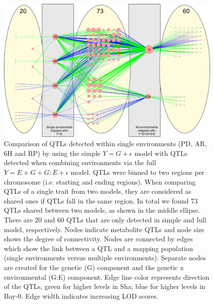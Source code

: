 \begin{figure}[h!]
  \centering
  \includegraphics[keepaspectratio,scale=0.30]{eps/image_3_2_2.eps}
  \caption[Comparison of QTLs detected]{Comparison of QTLs detected within single environments (PD, AR, 
          6H and RP) by using the simple $Y=G+\epsilon$ model with QTLs detected when combining environments via the full 
          $Y=E+G+G:E+\epsilon$ model. QTLs were binned to two regions per chromosome (i.e. starting and ending regions).  
          When comparing QTLs of a single trait from two models, they are considered as shared ones  if QTLs fall 
          in the same region. In total we found 73 QTLs shared between two models, as shown in the middle ellipse. 
          There are 20 and 60 QTLs that are only detected in simple and full model, respectively. Nodes indicate 
          metabolite QTLs and node size shows the degree of connectivity. Nodes are connected by edges which show 
          the link between a QTL and a mapping population (single environments versus multiple environments). 
          Separate nodes are created for the genetic (G) component and the genetic x environmental (G:E) component. 
          Edge line color represents direction of the QTLs, green for higher levels in Sha; blue for higher levels 
          in Bay-0. Edge width indicates increasing LOD scores.}
          \label{fig:qtlComparison}
\end{figure}

